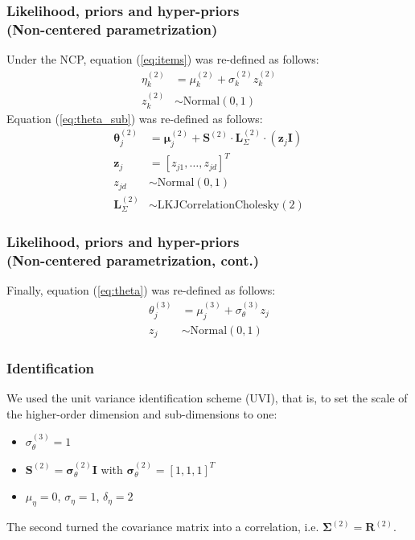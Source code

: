 \documentclass[nonav,sleutel]{beamer}
\begin{document}
	\begin{frame}
		\frametitle{Likelihood, priors and hyper-priors \\
			(Non-centered parametrization)}
		Under the NCP, equation (\ref{eq:items}) was re-defined as follows:
		\begin{align}
			\eta^{(2)}_{k} &= \mu^{(2)}_{k} + \sigma^{(2)}_{k} z^{(2)}_{k} \\
			z^{(2)}_{k} &\sim \text{Normal}(0,1)
		\end{align}
		Equation (\ref{eq:theta_sub}) was re-defined as follows:
		\begin{align}
			\boldsymbol{\theta}^{(2)}_{j} &= \boldsymbol{\mu}^{(2)}_{j} + \boldsymbol{S}^{(2)} \cdot \boldsymbol{L}^{(2)}_{\Sigma} \cdot  (\mathbf{z}_{j} \mathbf{I}) \\
			\mathbf{z}_{j} &= [ z_{j1}, \dots, z_{jd}]^{T} \\
			z_{jd} &\sim \text{Normal}(0,1) \\
			\boldsymbol{L}^{(2)}_{\Sigma} &\sim \text{LKJCorrelationCholesky}(2)
		\end{align}
	\end{frame}
	\begin{frame}
		\frametitle{Likelihood, priors and hyper-priors \\
			(Non-centered parametrization, cont.)}
		Finally, equation (\ref{eq:theta}) was re-defined as follows:
		\begin{align}
			\theta^{(3)}_{j} &= \mu^{(3)}_{j} + \sigma^{(3)}_{\theta} z_{j} \\
			z_{j} &\sim \text{Normal}(0,1)
		\end{align}
	\end{frame}
	\begin{frame}
		\frametitle{Identification}
		We used the unit variance identification scheme (UVI), that is, to set the scale of the higher-order dimension and sub-dimensions to one:
		\begin{itemize}
			\item $\sigma^{(3)}_{\theta} = 1$
			\item $\mathbf{S}^{(2)} = \pmb{\sigma}^{(2)}_{\theta} \mathbf{I}$ with $\pmb{\sigma}^{(2)}_{\theta} = [1, 1, 1]^{T}$
			\item $\mu_{\eta} = 0$, $\sigma_{\eta}=1$, $\delta_{\eta}=2$
		\end{itemize}
		The second turned the covariance matrix into a correlation, i.e. $\boldsymbol{\Sigma}^{(2)} = \boldsymbol{R}^{(2)}$.
	\end{frame}
\end{document}
